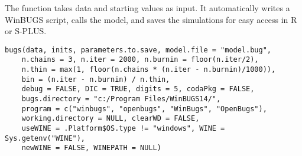 \begin{Description}\relax
The  function takes data and starting values as input.
It automatically writes a WinBUGS script, calls the model,
and saves the simulations for easy access in R or S-PLUS.
\end{Description}
\begin{Usage}
\begin{verbatim}
bugs(data, inits, parameters.to.save, model.file = "model.bug",
    n.chains = 3, n.iter = 2000, n.burnin = floor(n.iter/2),
    n.thin = max(1, floor(n.chains * (n.iter - n.burnin)/1000)),
    bin = (n.iter - n.burnin) / n.thin,
    debug = FALSE, DIC = TRUE, digits = 5, codaPkg = FALSE,
    bugs.directory = "c:/Program Files/WinBUGS14/",
    program = c("winbugs", "openbugs", "WinBugs", "OpenBugs"),
    working.directory = NULL, clearWD = FALSE,
    useWINE = .Platform$OS.type != "windows", WINE = Sys.getenv("WINE"),
    newWINE = FALSE, WINEPATH = NULL)
\end{verbatim}
\end{Usage}

